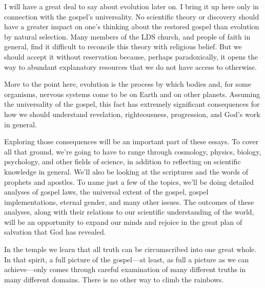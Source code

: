 	I will have a great deal to say about evolution later on. I bring it up here only in connection with the gospel's universality. No scientific theory or discovery should have a greater impact on one's thinking about the restored gospel than evolution by natural selection. Many members of the LDS church, and people of faith in general, find it difficult to reconcile this theory with religious belief. But we should accept it without reservation because, perhaps paradoxically, it opens the way to abundant explanatory resources that we do not have access to otherwise.

	More to the point here, evolution is the process by which bodies and, for some organisms, nervous systems come to be on Earth and on other planets. Assuming the universality of the gospel, this fact has extremely significant consequences for how we should understand revelation, righteousness, progression, and God's work in general.

	Exploring those consequences will be an important part of these essays. To cover all that ground, we're going to have to range through cosmology, physics, biology, psychology, and other fields of science, in addition to reflecting on scientific knowledge in general. We'll also be looking at the scriptures and the words of prophets and apostles. To name just a few of the topics, we'll be doing detailed analyses of gospel laws, the universal extent of the gospel, gospel implementations, eternal gender, and many other issues. The outcomes of these analyses, along with their relations to our scientific understanding of the world, will be an opportunity to expand our minds and rejoice in the great plan of salvation that God has revealed.

	In the temple we learn that all truth can be circumscribed into one great whole. In that spirit, a full picture of the gospel---at least, as full a picture as we can achieve---only comes through careful examination of many different truths in many different domains. There is no other way to climb the rainbows.
